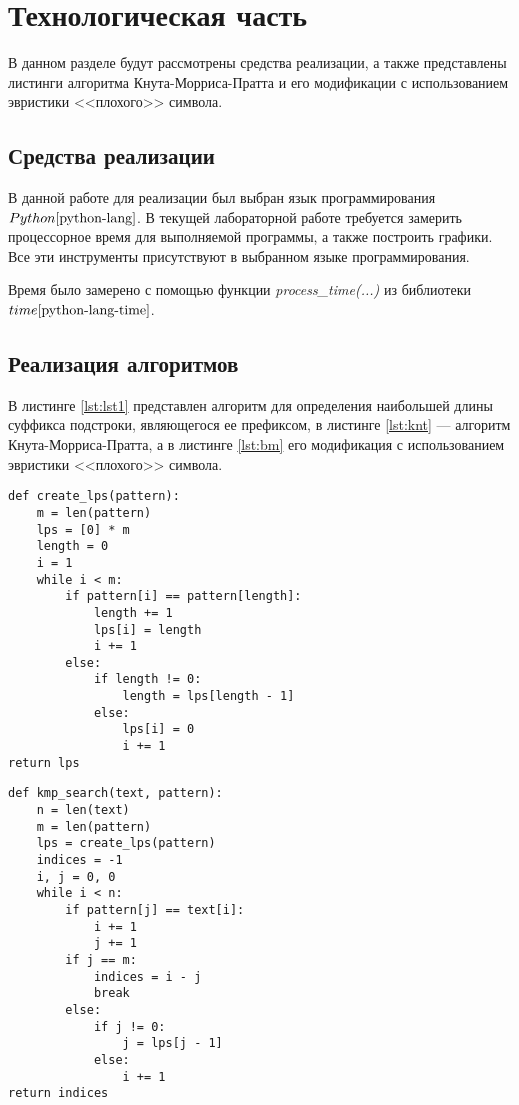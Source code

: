\chapter{Технологическая часть}

В данном разделе будут рассмотрены средства реализации, а также представлены листинги алгоритма Кнута-Морриса-Пратта и его модификации с использованием эвристики <<плохого>> символа.

\section{Средства реализации}
В данной работе для реализации был выбран язык программирования $Python \cite{python-lang}$. 
В текущей лабораторной работе требуется замерить процессорное время для выполняемой программы, а также построить графики. 
Все эти инструменты присутствуют в выбранном языке программирования.

Время было замерено с помощью функции \textit{process\_time(...)} из библиотеки $time \cite{python-lang-time}$.


\section{Реализация алгоритмов}

В листинге \ref{lst:lst1} представлен алгоритм для определения наибольшей длины суффикса подстроки, являющегося ее префиксом, в листинге \ref{lst:knt} --- алгоритм Кнута-Морриса-Пратта, а в листинге \ref{lst:bm} его модификация с использованием эвристики <<плохого>> символа.
\clearpage

\begin{center}
    \captionsetup{justification=raggedright,singlelinecheck=off}
    \begin{lstlisting}[label=lst:lst1,caption=Алгоритм определения наибольшей длины суффикса подстроки]
def create_lps(pattern):
	m = len(pattern)
	lps = [0] * m
	length = 0
	i = 1
	while i < m:
		if pattern[i] == pattern[length]:
			length += 1
			lps[i] = length
			i += 1
		else:
			if length != 0:
				length = lps[length - 1]
			else:
				lps[i] = 0
				i += 1
return lps
\end{lstlisting}
\end{center}


\begin{center}
    \captionsetup{justification=raggedright,singlelinecheck=off}
    \begin{lstlisting}[label=lst:knt,caption=Алгоритм Кнута-Морриса-Пратта]
def kmp_search(text, pattern):
	n = len(text)
	m = len(pattern)
	lps = create_lps(pattern)
	indices = -1
	i, j = 0, 0
	while i < n:
		if pattern[j] == text[i]:
			i += 1
			j += 1
		if j == m:
			indices = i - j
			break
		else:
			if j != 0:
				j = lps[j - 1]
			else:
				i += 1
return indices
\end{lstlisting}
\end{center}




